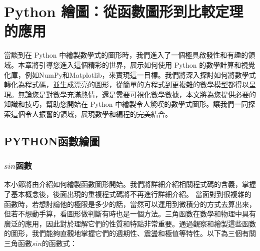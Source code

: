 \chapter{\textbf{Python} 繪圖：從函數圖形到比較定理的應用}

當談到在 Python 中繪製數學式的圖形時，我們進入了一個極具啟發性和有趣的領域。本章將引導您進入這個精彩的世界，展示如何使用 Python 的數學計算和視覺化庫，例如NumPy和Matplotlib，來實現這一目標。我們將深入探討如何將數學式轉化為程式碼，並生成漂亮的圖形，從簡單的方程式到更複雜的數學模型都得以呈現。無論您是對數學充滿熱情，還是需要可視化數學數據，本文將為您提供必要的知識和技巧，幫助您開始在 Python 中繪製令人驚嘆的數學式圖形。讓我們一同探索這個令人振奮的領域，展現數學和編程的完美結合。
\section{PYTHON函數繪圖}
\subsection{$sin$函數}
本小節將由介紹如何繪製函數圖形開始。我們將詳細介紹相關程式碼的含義，掌握了基本概念後，後面出現的重複程式碼將不再進行詳細介紹。
當面對到很複雜的函數時，若想討論他的極限是多少的話，當然可以運用到微積分的方式去算出來，但若不想動手算，看圖形做判斷有時也是一個方法。三角函數在數學和物理中具有廣泛的應用，因此對於理解它們的性質和特點非常重要。通過觀察和繪製這些函數的圖形，我們能夠直觀地掌握它們的週期性、震盪和極值等特性。以下為三個有關三角函數$sin$的函數式：

